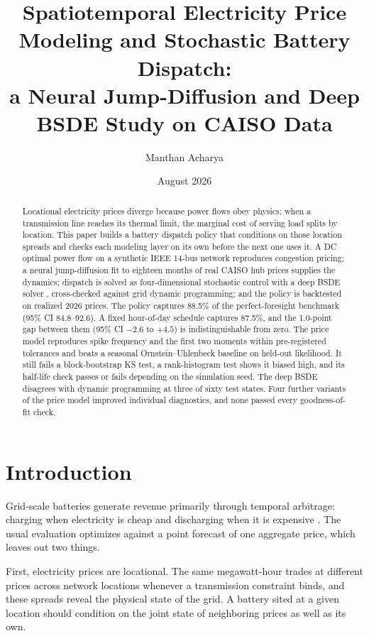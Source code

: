 \documentclass[11pt]{article}
\title{Spatiotemporal Electricity Price Modeling and Stochastic Battery
Dispatch:\\ a Neural Jump-Diffusion and Deep BSDE Study on CAISO Data}
\author{Manthan Acharya}
\date{August 2026}
\begin{document}
\maketitle

\begin{abstract}
Locational electricity prices diverge because power flows obey physics:
when a transmission line reaches its thermal limit, the marginal cost of
serving load splits by location. This paper builds a battery dispatch
policy that conditions on those location spreads and checks each modeling
layer on its own before the next one uses it. A DC optimal power flow on a synthetic IEEE 14-bus network
reproduces congestion pricing; a neural jump-diffusion fit to eighteen months of
real CAISO hub prices supplies the dynamics; dispatch is solved as
four-dimensional stochastic control with a deep BSDE solver
\cite{weinan2017,han2018}, cross-checked against grid dynamic programming;
and the policy is backtested on realized 2026 prices. The policy captures 88.5\% of
the perfect-foresight benchmark (95\% CI 84.8--92.6). A fixed hour-of-day
schedule captures 87.5\%, and the 1.0-point gap between them (95\% CI
$-2.6$ to $+4.5$) is indistinguishable from zero. The price model
reproduces spike frequency and the first two moments within pre-registered
tolerances and beats a seasonal Ornstein--Uhlenbeck baseline on held-out
likelihood. It still fails a block-bootstrap KS test, a rank-histogram test
shows it biased high, and its half-life check passes or fails depending on
the simulation seed. The deep BSDE disagrees with dynamic programming at
three of sixty test states. Four further variants of the price model
improved individual diagnostics, and none passed every goodness-of-fit
check.
\end{abstract}

\section{Introduction}

Grid-scale batteries generate revenue primarily through temporal arbitrage:
charging when electricity is cheap and discharging when it is expensive \cite{sioshansi2009}.
The usual evaluation optimizes against a point forecast of one aggregate
price, which leaves out two things.

First, electricity prices are locational. The same megawatt-hour
trades at different prices across network locations whenever a
transmission constraint binds, and these spreads reveal the physical state of
the grid. A battery sited at a given location should condition on the joint state
of neighboring prices as well as its own.
\end{document}
